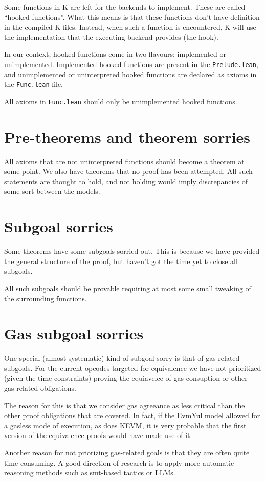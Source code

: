 Some functions in K are left for the backends to implement. These are called
``hooked functions''. What this means is that these functions don't have
definition in the compiled K files. Instead, when such a function is
encountered, K will use the implementation that the executing backend provides
(the hook).

In our context, hooked functions come in two flavours: implemented or
unimplemented. Implemented hooked functions are present in the
\href{https://runtimeverification.github.io/evm-equivalence/docs/EvmEquivalence/KEVM2Lean/Prelude.html}{\texttt{Prelude.lean}},
and unimplemented or uninterpreted hooked functions are declared as axioms in
the
\href{https://runtimeverification.github.io/evm-equivalence/docs/EvmEquivalence/KEVM2Lean/Func.html}{\texttt{Func.lean}}
file.

All axioms in \texttt{Func.lean} should only be unimplemented hooked functions.

\section{Pre-theorems and theorem sorries}

All axioms that are not uninterpreted functions should become a theorem at some
point. We also have theorems that no proof has been attempted. All such
statements are thought to hold, and not holding would imply discrepancies of
some sort between the models.

\section{Subgoal sorries}

Some theorems have some subgoals sorried out. This is because we have
provided the general structure of the proof, but haven't got the time yet to
close all subgoals.

All such subgoals should be provable requiring at most some small tweaking of
the surrounding functions.

\section{Gas subgoal sorries}

One special (almost systematic) kind of subgoal sorry is that of gas-related subgoals.
For the current opcodes targeted for equivalence we have not prioritized (given the time constraints) proving the equiavelce of gas consuption or other gas-related obligations.

The reason for this is that we consider gas agreeance as less critical than the other proof obligations that are covered.
In fact, if the EvmYul model allowed for a gasless mode of execution, as does KEVM, it is very probable that the first version of the equivalence proofs would have made use of it.

Another reason for not priorizing gas-related goals is that they are often quite time consuming. A good direction of research is to apply more automatic reasoning methods such as smt-based tactics or LLMs.
